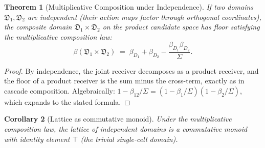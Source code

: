 \documentclass[twocolumn,11pt,a4paper]{article}
\newtheorem{theorem}{Theorem}[section]
\newtheorem{corollary}[theorem]{Corollary}
\newcommand{\Domain}{\mathfrak{D}}
\newcommand{\Sigmax}{\Sigma}
\begin{document}
\begin{theorem}[Multiplicative Composition under Independence]
\label{thm:mult-composition}
If two domains $\Domain_1, \Domain_2$ are independent (their action maps factor through orthogonal coordinates), the composite domain $\Domain_1 \times \Domain_2$ on the product candidate space has floor satisfying the multiplicative composition law:
\[
\beta(\Domain_1 \times \Domain_2) \;=\; \beta_{D_1} + \beta_{D_2} - \frac{\beta_{D_1} \beta_{D_2}}{\Sigmax}.
\]
\end{theorem}

\begin{proof}
By independence, the joint receiver decomposes as a product receiver, and the floor of a product receiver is the sum minus the cross-term, exactly as in cascade composition. Algebraically: $1 - \beta_{12}/\Sigmax = (1 - \beta_1/\Sigmax)(1 - \beta_2/\Sigmax)$, which expands to the stated formula.
\end{proof}

\begin{corollary}[Lattice as commutative monoid]
\label{cor:lattice-monoid}
Under the multiplicative composition law, the lattice of independent domains is a commutative monoid with identity element $\top$ (the trivial single-cell domain).
\end{corollary}
\end{document}
